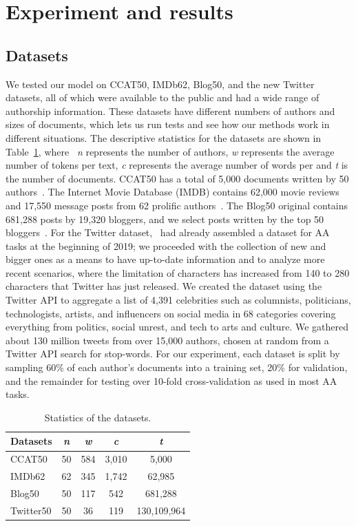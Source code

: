 \documentclass[conference]{IEEEtran}
\begin{document}
\section{Experiment and results}\label{sec4}
\subsection{Datasets}
We tested our model on CCAT50, IMDb62, Blog50, and the new Twitter datasets, all of which were available to the public and had a wide range of authorship information. These datasets have different numbers of authors and sizes of documents, which lets us run tests and see how our methods work in different situations. The descriptive statistics for the datasets are shown in Table~\ref{table2}, where ~\textit{n} represents the number of authors, \textit{w} represents the average number of tokens per text, \textit{c} represents the average number of words per and \textit{t} is the number of documents. CCAT50 has a total of 5,000 documents written by 50 authors~\cite{stamatatos2011plagiarism}. The Internet Movie Database (IMDB) contains 62,000 movie reviews and 17,550 message posts from 62 prolific authors~\cite{seroussi2014authorship}. The Blog50 original contains 681,288 posts by 19,320 bloggers, and we select posts written by the top 50 bloggers~\cite{schler2006effects}. For the Twitter dataset,~\cite{rocha2016authorship} had already assembled a dataset for AA tasks at the beginning of 2019; we proceeded with the collection of new and bigger ones as a means to have up-to-date information and to analyze more recent scenarios, where the limitation of characters has increased from 140 to 280 characters that Twitter has just released. We created the dataset using the Twitter API to aggregate a list of 4,391 celebrities such as columnists, politicians, technologists, artists, and influencers on social media in 68 categories covering everything from politics, social unrest, and tech to arts and culture. We gathered about 130 million tweets from over 15,000 authors, chosen at random from a Twitter API search for stop-words. For our experiment, each dataset is split by sampling 60\% of each author's documents into a training set, 20\% for validation, and the remainder for testing over 10-fold cross-validation as used in most AA tasks.
\begin{table}[!t]
\renewcommand{\arraystretch}{1.0}
 \caption{Statistics of the datasets.}
\label{table2} 
\centering
    \begin{tabular}{lcccc}
        \hline
        Datasets&\textit{n}&\textit{w}&\textit{c}&\textit{t}\\
\hline
       CCAT50&50&584&3,010&5,000\\
       IMDb62&62&345&1,742&62,985\\
       Blog50&50&117&542 &681,288\\
       Twitter50&50&36&119&130,109,964\\ 
       \hline
    \end{tabular}
\end{table}
\end{document}
